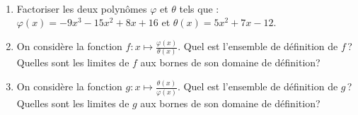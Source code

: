 %
      \begin{exo}~\\
            \begin{enumerate}
                  \item Factoriser les deux polyn\^omes $\varphi$ et $\theta$ tels que :
                        $\varphi (x) = -9x^3 -15x^2 + 8x + 16$ et $\theta (x) = 5x^2 + 7x - 12$.
                  \item On consid\`ere la fonction $f : x \mapsto \frac{\varphi (x)}{\theta (x)}$.
                        Quel est l'ensemble de d\'efinition de $f$\,? 
                        Quelles sont les limites de $f$ aux bornes de son domaine de d\'efinition?
                  \item On consid\`ere la fonction $g : x \mapsto \frac{\theta (x)}{\varphi (x)}$.
                        Quel est l'ensemble de d\'efinition de $g$\,? 
                        Quelles sont les limites de $g$ aux bornes de son domaine de d\'efinition?
            \end{enumerate}
      \end{exo}
%

